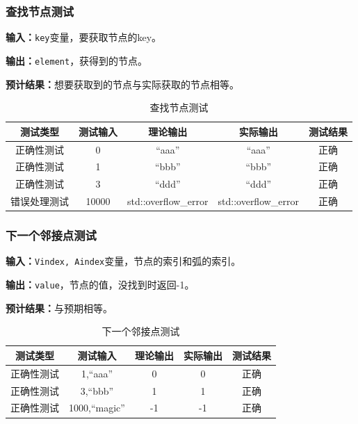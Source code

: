 \subsubsection{查找节点测试}
\textbf{输入：}\texttt{key}变量，要获取节点的key。
\par
\textbf{输出：}\texttt{element}，获得到的节点。
\par
\textbf{预计结果：}想要获取到的节点与实际获取的节点相等。
\begin{table}[h]
    \centering
    \caption{查找节点测试}
    \begin{tabular}{@{}ccccc@{}}
        \toprule
        \multicolumn{1}{c}{测试类型}    & \multicolumn{1}{c}{测试输入} & \multicolumn{1}{c}{理论输出} & \multicolumn{1}{c}{实际输出} &
        \multicolumn{1}{c}{测试结果} \\ \midrule
        \multicolumn{1}{c|}{正确性测试}  & 0&``aaa''&``aaa''&正确\\
        \multicolumn{1}{c|}{正确性测试}  & 1&``bbb''&``bbb''&正确\\
        \multicolumn{1}{c|}{正确性测试}  & 3&``ddd''&``ddd''&正确\\
        \multicolumn{1}{c|}{错误处理测试} & 10000& std::overflow\_error& std::overflow\_error& 正确\\ \bottomrule
    \end{tabular}
    \label{tab:gettest4}
\end{table}

\subsubsection{下一个邻接点测试}
\textbf{输入：}\texttt{Vindex, Aindex}变量，节点的索引和弧的索引。
\par
\textbf{输出：}\texttt{value}，节点的值，没找到时返回-1。
\par
\textbf{预计结果：}与预期相等。
\begin{table}[h]
    \centering
    \caption{下一个邻接点测试}
    \begin{tabular}{@{}ccccc@{}}
        \toprule
        \multicolumn{1}{c}{测试类型}    & \multicolumn{1}{c}{测试输入} & \multicolumn{1}{c}{理论输出} & \multicolumn{1}{c}{实际输出} &
        \multicolumn{1}{c}{测试结果} \\ \midrule
        \multicolumn{1}{c|}{正确性测试}  & 1,``aaa''&0&0&正确\\
        \multicolumn{1}{c|}{正确性测试}  & 3,``bbb''&1&1&正确\\
        \multicolumn{1}{c|}{正确性测试}  & 1000,``magic''&-1&-1&正确\\ \bottomrule
    \end{tabular}
    \label{tab:locatetest4}
\end{table}


